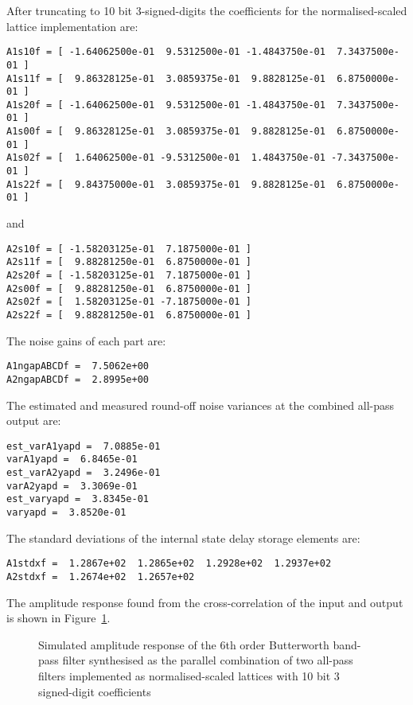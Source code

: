 \documentclass[a4paper,twoside,10pt,english]{report}
\begin{document}
After truncating to 10 bit 3-signed-digits the coefficients for the 
normalised-scaled lattice implementation are:
\begin{small}
\begin{verbatim}
A1s10f = [ -1.64062500e-01  9.5312500e-01 -1.4843750e-01  7.3437500e-01 ]
A1s11f = [  9.86328125e-01  3.0859375e-01  9.8828125e-01  6.8750000e-01 ]
A1s20f = [ -1.64062500e-01  9.5312500e-01 -1.4843750e-01  7.3437500e-01 ]
A1s00f = [  9.86328125e-01  3.0859375e-01  9.8828125e-01  6.8750000e-01 ]
A1s02f = [  1.64062500e-01 -9.5312500e-01  1.4843750e-01 -7.3437500e-01 ] 
A1s22f = [  9.84375000e-01  3.0859375e-01  9.8828125e-01  6.8750000e-01 ]
\end{verbatim}
\end{small}
and
\begin{small}
\begin{verbatim}
A2s10f = [ -1.58203125e-01  7.1875000e-01 ]
A2s11f = [  9.88281250e-01  6.8750000e-01 ]
A2s20f = [ -1.58203125e-01  7.1875000e-01 ]
A2s00f = [  9.88281250e-01  6.8750000e-01 ]
A2s02f = [  1.58203125e-01 -7.1875000e-01 ]
A2s22f = [  9.88281250e-01  6.8750000e-01 ]
\end{verbatim}
\end{small}
The noise gains of each part are:
\begin{small}
\begin{verbatim}
A1ngapABCDf =  7.5062e+00
A2ngapABCDf =  2.8995e+00
\end{verbatim}
\end{small}
The estimated and measured round-off noise variances at the combined all-pass 
output are:
\begin{small}
\begin{verbatim}
est_varA1yapd =  7.0885e-01
varA1yapd =  6.8465e-01
est_varA2yapd =  3.2496e-01
varA2yapd =  3.3069e-01
est_varyapd =  3.8345e-01
varyapd =  3.8520e-01
\end{verbatim}
\end{small}
The standard deviations of the internal state delay storage elements are:
\begin{small}
\begin{verbatim}
A1stdxf =  1.2867e+02  1.2865e+02  1.2928e+02  1.2937e+02
A2stdxf =  1.2674e+02  1.2657e+02
\end{verbatim}
\end{small}
The amplitude response found from the cross-correlation of the input
and output is shown in 
Figure~\ref{fig:Butt6NSPABP_combined_allpass_output_response}.
\begin{figure}[!htbp]
\begin{center}
\scalebox{0.7}{}
\caption{Simulated amplitude response of the 6th order Butterworth
band-pass filter synthesised as the parallel combination of two all-pass
filters implemented as normalised-scaled lattices with 10 bit 3 signed-digit
coefficients}
\label{fig:Butt6NSPABP_combined_allpass_output_response}
\end{center}
\end{figure}
\cleardoublepage
\end{document}
